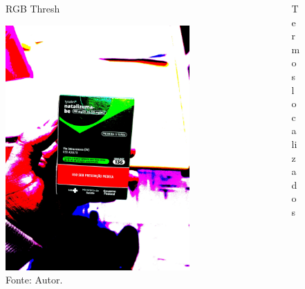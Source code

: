 \begin{frame}
	\begin{columns}
		\begin{column}{0.5\textwidth}
			\begin{figure}
				\caption*{RGB Thresh}
				\includegraphics[width=0.85\textwidth]{../pictures/tysabri_rgb_thresh.jpg}
				\caption*{Fonte: Autor.}
			\end{figure}
		\end{column}
		\begin{column}{0.5\textwidth}
			\begin{figure}
				\caption*{Termos localizados}

\end{figure}
\end{column}
\end{columns}
\end{frame}

